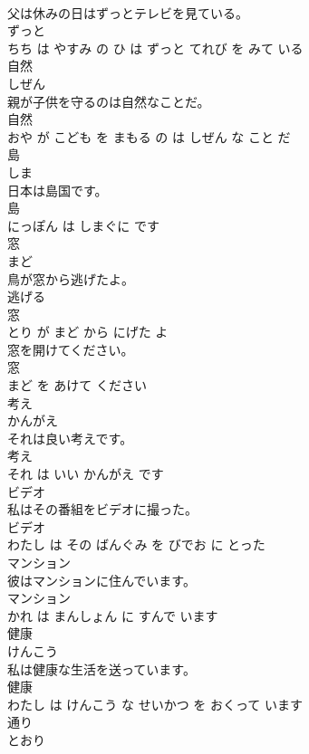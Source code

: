 \documentclass[8pt]{extreport}
\begin{document}
\begin{CJK}{UTF8}{min}
\\	父は休みの日はずっとテレビを見ている。	
\\	ずっと 
\\	ちち は やすみ の ひ は ずっと てれび を みて いる			
\\	自然	
\\	しぜん			
\\	親が子供を守るのは自然なことだ。	
\\	自然 
\\	おや が こども を まもる の は しぜん な こと だ			
\\	島	
\\	しま			
\\	日本は島国です。	
\\	島 
\\	にっぽん は しまぐに です			
\\	窓	
\\	まど			
\\	鳥が窓から逃げたよ。	
\\	逃げる 
\\	窓 
\\	とり が まど から にげた よ			
\\	窓を開けてください。	
\\	窓 
\\	まど を あけて ください			
\\	考え	
\\	かんがえ			
\\	それは良い考えです。	
\\	考え 
\\	それ は いい かんがえ です			
\\	ビデオ	
\\	私はその番組をビデオに撮った。	
\\	ビデオ 
\\	わたし は その ばんぐみ を びでお に とった			
\\	マンション	
\\	彼はマンションに住んでいます。	
\\	マンション 
\\	かれ は まんしょん に すんで います			
\\	健康	
\\	けんこう			
\\	私は健康な生活を送っています。	
\\	健康 
\\	わたし は けんこう な せいかつ を おくって います			
\\	通り	
\\	とおり			

\end{CJK}
\end{document}
